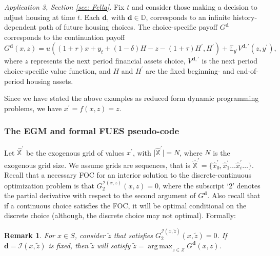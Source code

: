 \documentclass[12pt]{article}
\newtheorem{remark}{Remark}
\DeclareMathOperator*{\argmax}{arg\,max}
\newcommand{\DChSet}{\mathbb{D}}
\newcommand{\dVecVar}{\mathbf{d}}
\begin{document}
\emph{Application 3, Section \ref{sec: Fella}.} Fix $t$ and consider those making a decision to adjust housing at time $t$. Each $\dVecVar$, with $\dVecVar\in \DChSet$, corresponds to an infinite history-dependent path of future housing choices. The choice-specific payoff $G^{\dVecVar}$ corresponds to the continuation payoff
%
\begin{equation}
G^{\dVecVar}(x, z) = u((1+r)x + y_{t} + (1-\delta)H - z - (1+\tau)H^{\prime},H^{\prime}) + \mathbb{E}_{y^{\prime}}V^{\dVecVar, \prime}(z, y^{\prime}),
\end{equation}
%
where $z$ represents the next period financial assets choice, $V^{\dVecVar, \prime}$ is the next period choice-specific value function, and $H$ and $H^{\prime}$ are the fixed beginning- and end-of-period housing assets. 

Since we have stated the above examples as reduced form dynamic programming problems, we have $x^{\prime} = f(x,z) = z$. 


\subsubsection{The EGM and formal FUES pseudo-code}

Let $\hat{\mathbb{X}}^{\prime}$ be the exogenous grid of values $x^{\prime}$, with $\vert \hat{\mathbb{X}}^{\prime}\vert = N$, where $N$ is the exogenous grid size. We assume grids are sequences, that is $\hat{\mathbb{X}}^{\prime} = \{\hat{x}_{0}^{\prime},\hat{x}_{1}^{\prime}\dots \hat{x}_{i}^{\prime}\dots\}$. Recall that a necessary FOC for an interior solution to the discrete-continuous optimization problem is that $G^{\mathcal{I}(x,z)}_{2}(x,z) = 0$, where the subscript `$2$' denotes the partial derivative with respect to the second argument of $G^{\dVecVar}$. Also recall that if a continuous choice satisfies the FOC, it will be optimal conditional on the discrete choice (although, the discrete choice may not optimal). Formally:
%
\begin{remark}
For $x\in S$, consider $\tilde{z}$ that satisfies $G_{2}^{\mathcal{I}(x,\tilde{z})}(x, \tilde{z}) = 0$. If $\dVecVar = \mathcal{I}(x,\tilde{z})$ is fixed, then $\tilde{z}$ will satisfy $\tilde{z} = \argmax_{z\in Z} G^{\dVecVar}(x,z)$.
\end{remark}
\end{document}
